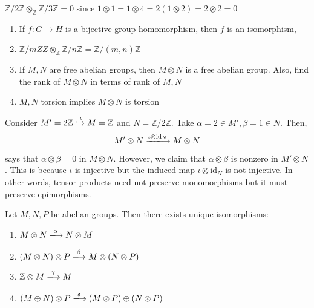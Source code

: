 \documentclass[oneside, 12pt]{scrbook}
\newcommand{\ZZ}{\mathbb Z}
\theoremstyle{theorem}
\begin{document}
\begin{example}
$\ZZ/2\ZZ \otimes_{\ZZ} \ZZ / 3\ZZ = 0$ since $1 \otimes 1 = 1 \otimes 4 = 2(1 \otimes 2) = 2 \otimes 2 = 0$
\end{example}

\begin{exercise}
\begin{enumerate}
\item If $f : G \rightarrow H$ is a bijective group homomorphism, then $f$ is an isomorphism, 

\item $\ZZ / m ZZ \otimes_{\ZZ} \ZZ / n \ZZ = \ZZ / (m,n) \ZZ$
\item If $M,N$ are free abelian groups, then $M \otimes N$ is a free abelian group. Also, find the rank of $M \otimes N$ in terms of rank of $M,N$
\item $M,N$ torsion implies $M \otimes N$ is torsion
\end{enumerate}
\end{exercise}

\begin{example}
Consider $M' = 2\ZZ \xhookrightarrow{\iota} M  =\ZZ$ and $N = \ZZ / 2 \ZZ$. Take $\alpha = 2 \in M' , \beta = 1 \in N$. Then,
\begin{equation}
M' \otimes N \xlongrightarrow{\iota \otimes \mathrm{id}_{N}} M \otimes N
\end{equation} 
says that $\alpha \otimes \beta =0$ in $M \otimes N$. However, we claim that $\alpha \otimes \beta $ is nonzero in $M' \otimes N$. This is because $\iota$ is injective but the induced map $\iota \otimes \mathrm{id}_{N}$ is not injective. In other words, tensor products need not preserve monomorphisms but it must preserve epimorphisms.
\end{example}

\begin{theorem}
Let $M,N,P$ be abelian groups. Then there exists unique isomorphisms: 
\begin{enumerate}
\item $M \otimes N \xlongrightarrow{\alpha} N \otimes M$
\item $(M \otimes N)\otimes P \xlongrightarrow{\beta} M \otimes (N \otimes P)$
\item $\ZZ\otimes M \xlongrightarrow{\gamma} M $
\item $(M \oplus N) \otimes P \xlongrightarrow{\delta} (M \otimes P) \oplus (N \otimes P)$
\end{enumerate}
\end{theorem}
\end{document}
